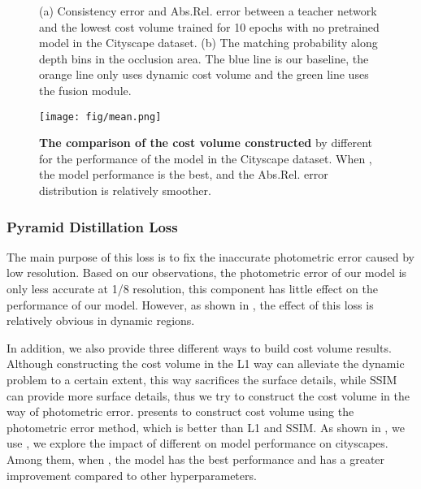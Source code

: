 \documentclass[journal]{IEEEtran}
\begin{document}
\begin{figure}[t]
  \centering
  \caption{(a) Consistency error and Abs.Rel. error between a teacher network and the lowest cost volume trained for 10 epochs with no pretrained model in the Cityscape dataset. (b) The matching probability along depth bins in the occlusion area. The blue line is our baseline, the orange line only uses dynamic cost volume and the green line uses the fusion module.}
  \label{fig:8}
\end{figure}

\begin{figure}[!ht]
\centering
\texttt{[image: fig/mean.png]}
\caption{\textbf{The comparison of the cost volume constructed} by different  for the performance of the model in the Cityscape dataset. When , the model performance is the best, and the Abs.Rel. error distribution is relatively smoother.}
\label{fig:9}
\end{figure}

\subsubsection{Pyramid Distillation Loss}
The main purpose of this loss is to fix the inaccurate photometric error caused by low resolution. Based on our observations, the photometric error of our model is only less accurate at 1/8 resolution, this component has little effect on the performance of our model. However, as shown in , the effect of this loss is relatively obvious in dynamic regions.

In addition, we also provide three different ways to build cost volume results.  Although constructing the cost volume in the L1 way can alleviate the dynamic problem to a certain extent, this way sacrifices the surface details, while SSIM can provide more surface details, thus we try to construct the cost volume in the way of photometric error.  presents to construct cost volume using the photometric error method, which is better than L1 and SSIM. As shown in , we use , we explore the impact of different  on model performance on cityscapes. Among them, when , the model has the best performance and has a greater improvement compared to other hyperparameters.
\end{document}
